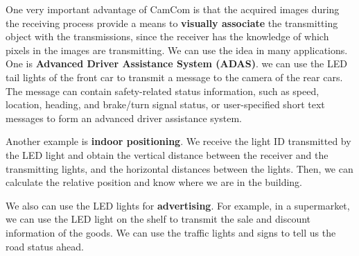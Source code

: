 



One very important advantage of CamCom is that the acquired images during the receiving process provide a means to \textbf{visually associate} the transmitting object with the transmissions, since the receiver has the knowledge of which pixels in the images are transmitting. We can use the idea in many applications. One is \textbf{Advanced Driver Assistance System (ADAS)}. we can use the LED tail lights of the front car to transmit a message to the camera of the rear cars. The message can contain safety-related status information, such as speed, location, heading, and brake/turn signal status, or user-specified short text messages to form an advanced driver assistance system. 

Another example is \textbf{indoor positioning}. We receive the light ID transmitted by the LED light and obtain the vertical distance between the receiver and the transmitting lights, and the horizontal distances between the lights. Then, we can calculate the relative position and know where we are in the building. 

We also can use the LED lights for \textbf{advertising}. For example, in a supermarket, we can use the LED light on the shelf to transmit the sale and discount information of the goods. We can use the traffic lights and signs to tell us the road status ahead. 


